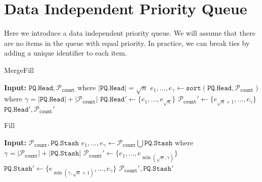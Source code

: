 \section{Data Independent Priority Queue}
Here we introduce a data independent priority queue. We will assume that there are no items in the queue
with equal priority. In practice, we can break ties by adding a unique identifier to each item.

\newcommand{\PQhead}{\texttt{PQ.Head}}
\newcommand{\PQstash}{\texttt{PQ.Stash}}
\newcommand{\PQcounter}{{\texttt{count}}}
\newcommand{\PQpartition}{\mathcal{P}}
\newcommand{\MergeFill}{\texttt{MergeFill}}
\newcommand{\Fill}{\texttt{Fill}}
\newcommand{\sqrtn}{{\sqrt{n}}}
\newcommand{\good}{\mathcal{G}}
\newcommand{\bad}{\mathcal{B}}

\begin{algorithm}
	\caption{MergeFill}
	\begin{algorithmic}[1]
			\State \textbf{Input:} $\PQhead, \PQpartition_\PQcounter$ where $|\PQhead| = \sqrtn$
			\State $e_1, ..., e_\gamma \gets \texttt{sort}(\PQhead, \PQpartition_\PQcounter)$ where $\gamma = |\PQhead| + |\PQpartition_\PQcounter|$
			\State $\PQhead' \gets \{e_1, ..., e_\sqrtn\}$
			\State $\PQpartition_\PQcounter' \gets \{e_{\sqrtn + 1}, ..., e_\gamma\}$
			\State \Return $\PQhead', \PQpartition_\PQcounter'$
	\end{algorithmic}
\end{algorithm}

\begin{algorithm}
	\caption{Fill}
	\begin{algorithmic}[1]
			\State \textbf{Input:} $\PQpartition_\PQcounter, \PQstash$
			\State $e_1, ..., e_\gamma \gets \PQpartition_\PQcounter \bigcup \PQstash$ where $\gamma = |\PQpartition_\PQcounter| + |\PQstash|$
			\State $\PQpartition_\PQcounter' \gets \{e_1, ..., e_{\min(\sqrtn, \gamma)}\}$
			\State $\PQstash' \gets \{e_{\min(\gamma, \sqrtn + 1)}, ..., e_\gamma\}$
			\State \Return $\PQpartition_\PQcounter', \PQstash'$
	\end{algorithmic}
\end{algorithm}


